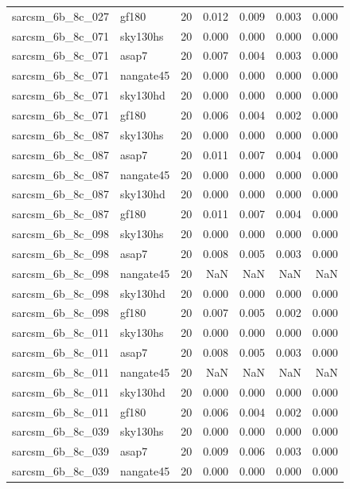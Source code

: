 \begin{tabular}{llrrrrr}
sarcsm\_6b\_8c\_027 & gf180 & 20 & 0.012 & 0.009 & 0.003 & 0.000 \\
sarcsm\_6b\_8c\_071 & sky130hs & 20 & 0.000 & 0.000 & 0.000 & 0.000 \\
sarcsm\_6b\_8c\_071 & asap7 & 20 & 0.007 & 0.004 & 0.003 & 0.000 \\
sarcsm\_6b\_8c\_071 & nangate45 & 20 & 0.000 & 0.000 & 0.000 & 0.000 \\
sarcsm\_6b\_8c\_071 & sky130hd & 20 & 0.000 & 0.000 & 0.000 & 0.000 \\
sarcsm\_6b\_8c\_071 & gf180 & 20 & 0.006 & 0.004 & 0.002 & 0.000 \\
sarcsm\_6b\_8c\_087 & sky130hs & 20 & 0.000 & 0.000 & 0.000 & 0.000 \\
sarcsm\_6b\_8c\_087 & asap7 & 20 & 0.011 & 0.007 & 0.004 & 0.000 \\
sarcsm\_6b\_8c\_087 & nangate45 & 20 & 0.000 & 0.000 & 0.000 & 0.000 \\
sarcsm\_6b\_8c\_087 & sky130hd & 20 & 0.000 & 0.000 & 0.000 & 0.000 \\
sarcsm\_6b\_8c\_087 & gf180 & 20 & 0.011 & 0.007 & 0.004 & 0.000 \\
sarcsm\_6b\_8c\_098 & sky130hs & 20 & 0.000 & 0.000 & 0.000 & 0.000 \\
sarcsm\_6b\_8c\_098 & asap7 & 20 & 0.008 & 0.005 & 0.003 & 0.000 \\
sarcsm\_6b\_8c\_098 & nangate45 & 20 & NaN & NaN & NaN & NaN \\
sarcsm\_6b\_8c\_098 & sky130hd & 20 & 0.000 & 0.000 & 0.000 & 0.000 \\
sarcsm\_6b\_8c\_098 & gf180 & 20 & 0.007 & 0.005 & 0.002 & 0.000 \\
sarcsm\_6b\_8c\_011 & sky130hs & 20 & 0.000 & 0.000 & 0.000 & 0.000 \\
sarcsm\_6b\_8c\_011 & asap7 & 20 & 0.008 & 0.005 & 0.003 & 0.000 \\
sarcsm\_6b\_8c\_011 & nangate45 & 20 & NaN & NaN & NaN & NaN \\
sarcsm\_6b\_8c\_011 & sky130hd & 20 & 0.000 & 0.000 & 0.000 & 0.000 \\
sarcsm\_6b\_8c\_011 & gf180 & 20 & 0.006 & 0.004 & 0.002 & 0.000 \\
sarcsm\_6b\_8c\_039 & sky130hs & 20 & 0.000 & 0.000 & 0.000 & 0.000 \\
sarcsm\_6b\_8c\_039 & asap7 & 20 & 0.009 & 0.006 & 0.003 & 0.000 \\
sarcsm\_6b\_8c\_039 & nangate45 & 20 & 0.000 & 0.000 & 0.000 & 0.000 \\

\end{tabular}
